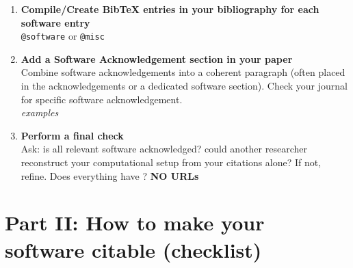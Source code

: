 \documentclass[twocolumn]{openjournal}
\begin{document}
\begin{enumerate}


    \item \textbf{Compile/Create BibTeX entries in your bibliography for each software entry} \\

    \texttt{@software} or \texttt{@misc}

    

    \item \textbf{Add a Software Acknowledgement section in your paper} \\
    Combine software acknowledgements into a coherent paragraph (often placed in the acknowledgements or a dedicated software section). Check your journal for specific software acknowledgement. \\
    
    \textit{examples }\\



    \item \textbf{Perform a final check} \\
    Ask: is all relevant software acknowledged? 
    could another researcher reconstruct your computational setup from your citations alone? If not, refine. Does everything have ? 
    \textbf{NO URLs}
\end{enumerate}

\section*{Part II: How to make your software citable (checklist)}

\end{document}
